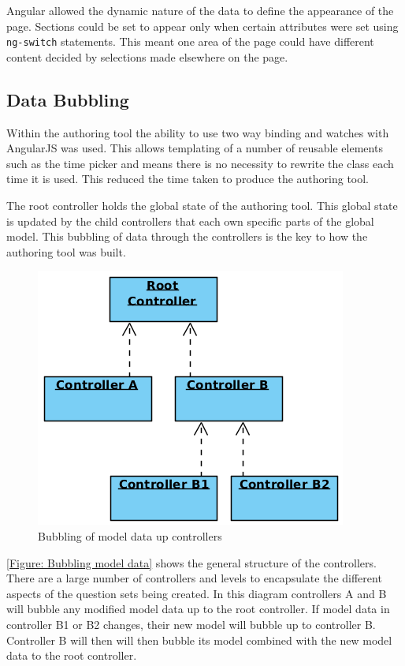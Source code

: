 Angular allowed the dynamic nature of the data to define the appearance of the page. Sections could be set to appear only when certain attributes were set using \lstinline|ng-switch| statements. This meant one area of the page could have different content decided by selections made elsewhere on the page.

\subsection{Data Bubbling}
\label{Section:Authoring_Data_bubbling}

Within the authoring tool the ability to use two way binding and watches with AngularJS was used. This allows templating of a number of reusable elements such as the time picker and means there is no necessity to rewrite the class each time it is used. This reduced the time taken to produce the authoring tool.

The root controller holds the global state of the authoring tool. This global state is updated by the child controllers that each own specific parts of the global model. This bubbling of data through the controllers is the key to how the authoring tool was built.

\begin{figure}[h]
	\centering
		\includegraphics[scale=0.4]{../figures/authoring_tool/controller_bubbling.png} 		
	\caption{\label{Figure: Bubbling model data} Bubbling of model data up controllers} 	
\end{figure}

\autoref{Figure: Bubbling model data} shows the general structure of the controllers. There are a large number of controllers and levels to encapsulate the different aspects of the question sets being created. In this diagram controllers A and B will bubble any modified model data up to the root controller. If model data in controller B1 or B2 changes, their new model will bubble up to controller B. Controller B will then will then bubble its model combined with the new model data to the root controller.

